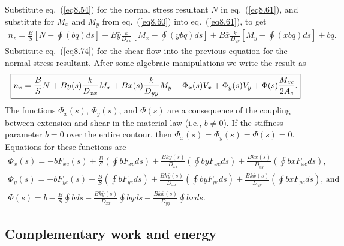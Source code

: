 \documentclass{AeroStructure-ERJohnson}
\begin{document}
Substitute eq.~(\ref{eq8.54}) for the normal stress resultant
$\bar{N}$ in eq.~(\ref{eq8.61}), and substitute for $\bar{M}_{x}$
and $\bar{M}_{y}$ from eq.~(\ref{eq8.60}) into eq.~(\ref{eq8.61}),
to get
\begin{align}\label{eq8.76}
n_{z}=\frac{B}{S}[N-\oint(b q) d s]+B \bar{y} \frac{k}{D_{x
x}}\left[M_{x}-\oint(y b q) d s\right]+B \bar{x} \frac{k}{D_{y
y}}\left[M_{y}-\oint(x b q) d s\right]+b q.
\end{align}
Substitute eq.~(\ref{eq8.74}) for the shear flow into the previous
equation for the normal stress resultant. After some algebraic
manipulations we write the result as
\begin{align}\label{eq8.77}
\fbox{$\displaystyle n_{z}=\frac{B}{S} N+B \bar{y}(s)
\frac{k}{D_{x x}} M_{x}+B \bar{x}(s) \frac{k}{D_{y y}}
M_{y}+\Phi_{x}(s) V_{x}+\Phi_{y}(s) V_{y}+\Phi(s) \frac{M_{z c}}{2
A_{c}}.$}
\end{align}
The functions $\Phi_{x}(s)$, $\Phi_{y}(s)$, and $\Phi(s)$ are a
consequence of the coupling between extension and shear in the
material law (i.e., $b \neq 0$). If the stiffness parameter $b=0$
over the entire contour, then $\Phi_{x}(s)=\Phi_{y}(s)=\Phi(s)=0$.
Equations for these functions are
\begin{gather}
\Phi_{x}(s)=-b F_{x c}(s)+\frac{B}{S}\left(\oint b F_{x c} d
s\right)+\frac{B k \bar{y}(s)}{D_{x x}}\left(\oint b y F_{x c} d
s\right)+\frac{B k \bar{x}(s)}{D_{y y}}\left(\oint b x F_{x c} d
s\right),\label{eq8.78}\\
\Phi_{y}(s)=-b F_{y c}(s)+\frac{B}{S}\left(\oint b F_{y c} d
s\right)+\frac{B k \bar{y}(s)}{D_{x x}}\left(\oint b y F_{y c} d
s\right)+\frac{B k \bar{x}(s)}{D_{y y}}\left(\oint b x F_{y c} d
s\right)\mbox{, and }\label{eq8.79}\\
\Phi(s)=b-\frac{B}{S} \oint b d s-\frac{B k \bar{y}(s)}{D_{x x}}
\oint b y d s-\frac{B k \bar{x}(s)}{D_{y y}} \oint b x d
s.\label{eq8.80}
\end{gather}

\subsection{Complementary work and energy}\label{sec8.2.3}
\end{document}
